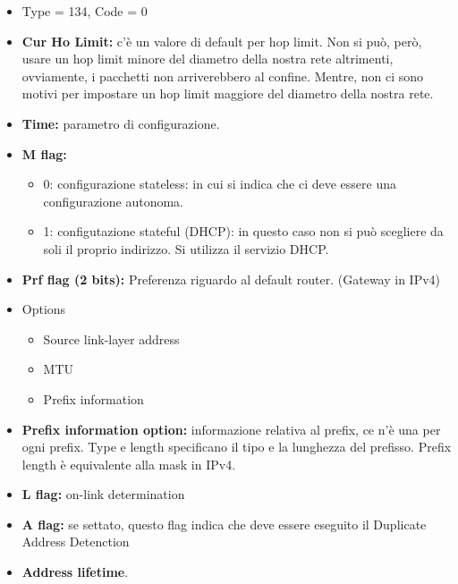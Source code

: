 \documentclass{article}
\begin{document}
\begin{itemize}
    \item Type = 134, Code = 0
    \item \textbf{Cur Ho Limit:} c'è un valore di default per hop limit. Non si può, però, usare un hop limit minore del diametro della nostra rete altrimenti, ovviamente, i pacchetti non arriverebbero al confine. Mentre, non ci sono motivi per impostare un hop limit maggiore del diametro della nostra rete.
    \item \textbf{Time:} parametro di configurazione.
    \item \textbf{M flag:} 
        \begin{itemize}
            \item 0: configurazione stateless: in cui si indica che ci deve essere una configurazione autonoma.
            \item 1: configutazione stateful (DHCP): in questo caso non si può scegliere da soli il proprio indirizzo. Si utilizza il servizio DHCP.
        \end{itemize}
    \item \textbf{Prf flag (2 bits):} Preferenza riguardo al default router. (Gateway in IPv4)
    \item Options
        \begin{itemize}
            \item Source link-layer address
            \item MTU
            \item Prefix information
        \end{itemize}
    \item \textbf{Prefix information option:} informazione relativa al prefix, ce n'è una per ogni prefix. Type e length specificano il tipo e la lunghezza del prefisso. Prefix length è equivalente alla mask in IPv4.
    \item \textbf{L flag:} on-link determination
    \item \textbf{A flag:} se settato, questo flag indica che deve essere eseguito il Duplicate Address Detenction
    \item \textbf{Address lifetime}.
\end{itemize}
\end{document}
